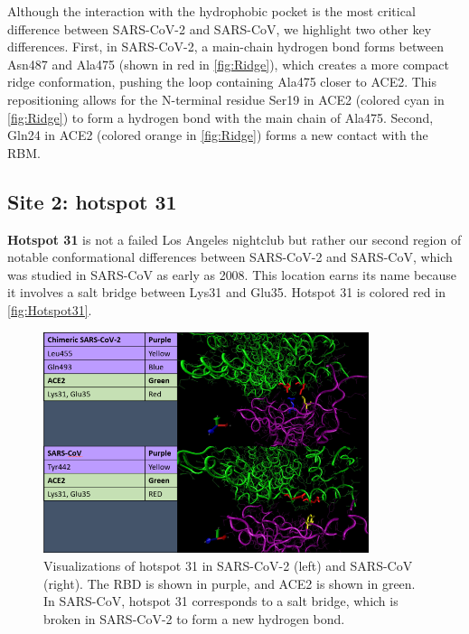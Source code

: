 Although the interaction with the hydrophobic pocket is the most critical difference between SARS-CoV-2 and SARS-CoV, we highlight two other key differences. First, in SARS-CoV-2, a main-chain hydrogen bond forms between Asn487 and Ala475 (shown in red in \autoref{fig:Ridge}), which creates a more compact ridge conformation, pushing the loop containing Ala475 closer to ACE2. This repositioning allows for the N-terminal residue Ser19 in ACE2 (colored cyan in \autoref{fig:Ridge}) to form a hydrogen bond with the main chain of Ala475. Second, Gln24 in ACE2 (colored orange in \autoref{fig:Ridge}) forms a new contact with the RBM.

\FloatBarrier
{}
\subsection{Site 2: hotspot 31}

\textbf{Hotspot 31} is not a failed Los Angeles nightclub but rather our second region of notable conformational differences between SARS-CoV-2 and SARS-CoV, which was studied in SARS-CoV as early as 2008. This location earns its name because it involves a salt bridge between Lys31 and Glu35. Hotspot 31 is colored red in \autoref{fig:Hotspot31}.\\

\begin{qbox}\end{qbox}

\begin{figure}[h]
	\centering
	\mySfFamily
	\includegraphics[width = 0.85\textwidth]{../images/Hotspot31.png}
	\caption{Visualizations of hotspot 31 in SARS-CoV-2 (left) and SARS-CoV (right). The RBD is shown in purple, and ACE2 is shown in green. In SARS-CoV, hotspot 31 corresponds to a salt bridge, which is broken in SARS-CoV-2 to form a new hydrogen bond.}
	\label{fig:Hotspot31}
\end{figure}

